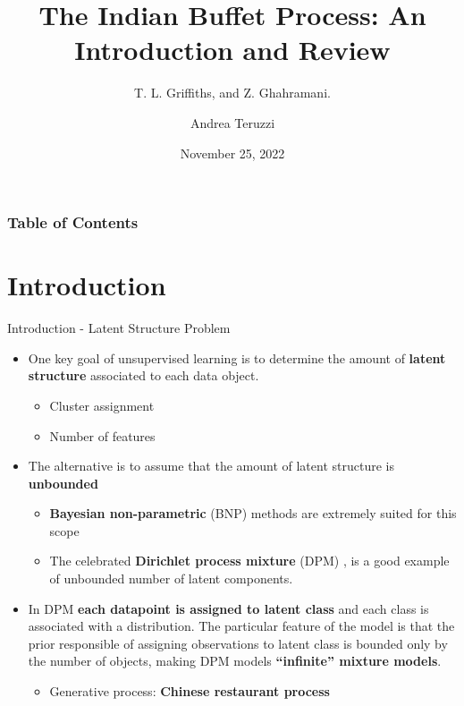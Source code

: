 \documentclass[aspectratio=169,xcolor=dvipsnames]{beamer}
\title[IBP, Griffiths and Ghahramani]{The Indian Buffet Process: An Introduction and Review
} \subtitle{T. L. Griffiths, and Z. Ghahramani.}
\author[andrea.teruzzi@proton.me] {Andrea Teruzzi}
\date[VSI – BayesLab]{November 25, 2022}
\begin{document}
\begin{frame}
    \titlepage
\end{frame}
  \begin{frame}
    \frametitle{Table of Contents}
    \tableofcontents
  \end{frame}


\section{Introduction} 
\begin{frame}{Introduction - Latent Structure Problem}
\setlength{\leftmargini}{0.2cm}
\begin{itemize}[<+->]
    \item One key goal of unsupervised learning is to determine the amount of \textbf{latent structure} associated to each data object.
    \begin{itemize}[<+->]
        \item Cluster assignment
        \item Number of features 
    \end{itemize}
    \item The alternative is to assume that the amount of latent structure is \textbf{unbounded} 
    \begin{itemize}
        \item \textbf{Bayesian non-parametric} (BNP) methods are extremely suited for this scope
        \item The celebrated \textbf{Dirichlet process mixture} (DPM) , is a good example of unbounded number of latent components. 
    \end{itemize}
    \item In DPM \textbf{each datapoint is assigned to latent class} and each class is associated with a distribution. The particular feature of the model is that the prior responsible of assigning observations to latent class is bounded only by the number of objects, making DPM models \textbf{“infinite” mixture models}.
    \begin{itemize}
        \item Generative process: \textbf{Chinese restaurant process}
    \end{itemize}
\end{itemize}
\end{frame}
\end{document}

